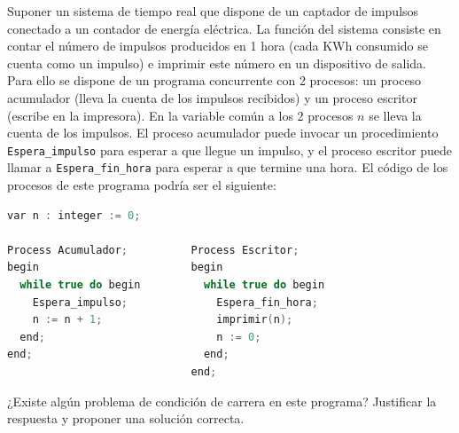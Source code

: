 \begin{ejercicio}
Suponer un sistema de tiempo real que dispone de un captador de impulsos conectado a un contador de energía eléctrica. La función del sistema consiste en contar el número de impulsos producidos en 1 hora (cada KWh consumido se cuenta como un impulso) e imprimir este número en un dispositivo de salida. Para ello se dispone de un programa concurrente con 2 procesos: un proceso acumulador (lleva la cuenta de los impulsos recibidos) y un proceso escritor (escribe en la impresora). En la variable común a los 2 procesos $n$ se lleva la cuenta de los impulsos. El proceso acumulador puede invocar un procedimiento \texttt{Espera\_impulso} para esperar a que llegue un impulso, y el proceso escritor puede llamar a \texttt{Espera\_fin\_hora} para esperar a que termine una hora. El código de los procesos de este programa podría ser el siguiente:

\begin{lstlisting}[language=C++]
var n : integer := 0;

Process Acumulador;          Process Escritor;
begin                        begin
  while true do begin          while true do begin
    Espera_impulso;              Espera_fin_hora;
    n := n + 1;                  imprimir(n);
  end;                           n := 0;
end;                           end;
                             end;
\end{lstlisting}
¿Existe algún problema de condición de carrera en este programa? Justificar la respuesta y proponer una solución correcta.
\end{ejercicio}


